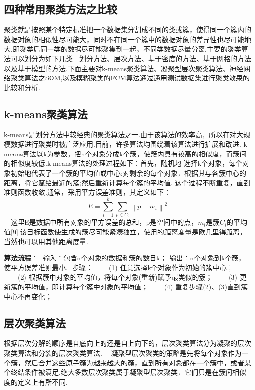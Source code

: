\subsection{四种常用聚类方法之比较}\label{ux56dbux79cdux5e38ux7528ux805aux7c7bux65b9ux6cd5ux4e4bux6bd4ux8f83}

​
聚类就是按照某个特定标准把一个数据集分割成不同的类或簇，使得同一个簇内的数据对象的相似性尽可能大，同时不在同一个簇中的数据对象的差异性也尽可能地大.即聚类后同一类的数据尽可能聚集到一起，不同类数据尽量分离.
​
主要的聚类算法可以划分为如下几类：划分方法、层次方法、基于密度的方法、基于网格的方法以及基于模型的方法.下面主要对k-means聚类算法、凝聚型层次聚类算法、神经网络聚类算法之SOM,以及模糊聚类的FCM算法通过通用测试数据集进行聚类效果的比较和分析.

\subsection{k-means聚类算法}\label{k-meansux805aux7c7bux7b97ux6cd5}

k-means是划分方法中较经典的聚类算法之一.由于该算法的效率高，所以在对大规模数据进行聚类时被广泛应用.目前，许多算法均围绕着该算法进行扩展和改进.
k-means算法以k为参数，把n个对象分成k个簇，使簇内具有较高的相似度，而簇间的相似度较低.k-means算法的处理过程如下：首先，随机地
选择k个对象，每个对象初始地代表了一个簇的平均值或中心;对剩余的每个对象，根据其与各簇中心的距离，将它赋给最近的簇;然后重新计算每个簇的平均值.
这个过程不断重复，直到准则函数收敛.通常，采用平方误差准则，其定义如下：
\[
E=\sum_{i=1}^{k}\sum_{p\in C_i}\left\|p-m_i\right\|^2
\]
　这里E是数据中所有对象的平方误差的总和，p是空间中的点，$m_i$是簇$C_i$的平均值{[}9{]}.该目标函数使生成的簇尽可能紧凑独立，使用的距离度量是欧几里得距离，当然也可以用其他距离度量.

\textbf{算法流程}： ​ 输入：包含n个对象的数据和簇的数目k； ​
输出：n个对象到k个簇，使平方误差准则最小. ​ 步骤： 　　(1)
任意选择k个对象作为初始的簇中心； 　　(2)
根据簇中对象的平均值，将每个对象(重新)赋予最类似的簇； 　　(3)
更新簇的平均值，即计算每个簇中对象的平均值； 　　(4)
重复步骤(2)、(3)直到簇中心不再变化；

\subsection{层次聚类算法}\label{ux5c42ux6b21ux805aux7c7bux7b97ux6cd5}

​
根据层次分解的顺序是自底向上的还是自上向下的，层次聚类算法分为凝聚的层次聚类算法和分裂的层次聚类算法.
　凝聚型层次聚类的策略是先将每个对象作为一个簇，然后合并这些原子簇为越来越大的簇，直到所有对象都在一个簇中，或者某个终结条件被满足.绝大多数层次聚类属于凝聚型层次聚类，它们只是在簇间相似度的定义上有所不同.

